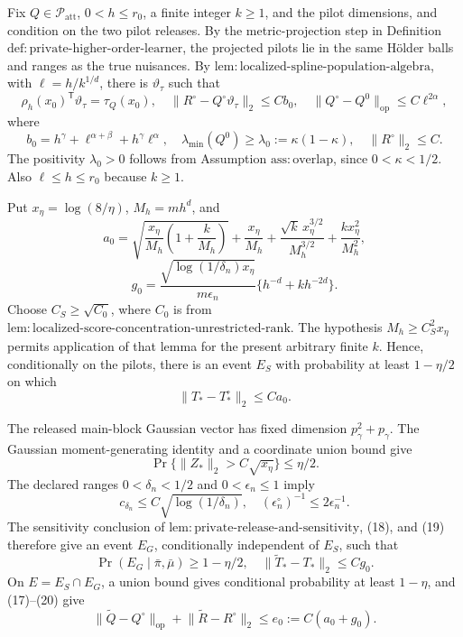 Fix \(Q\in\mathcal P_{\mathrm{att}}\), \(0<h\le r_0\), a finite integer \(k\ge1\), and the pilot dimensions, and condition on the two pilot releases.  By the metric-projection step in Definition \(\mathrm{def{:}private\text{-}higher\text{-}order\text{-}learner}\), the projected pilots lie in the same H\"older balls and ranges as the true nuisances.  By \(\mathrm{lem{:}localized\text{-}spline\text{-}population\text{-}algebra}\), with \(\ell=h/k^{1/d}\), there is \(\vartheta_\tau\) such that
\[
 \rho_h(x_0)^{\mathsf T}\vartheta_\tau=\tau_Q(x_0),\quad
 \lVert R^\circ-Q^\circ\vartheta_\tau\rVert_2\le Cb_0,
 \quad
 \lVert Q^\circ-Q^0\rVert_{\mathrm{op}}\le C\ell^{2\alpha}, \tag{14}
\]
where
\[
 b_0=h^\gamma+\ell^{\alpha+\beta}+h^\gamma\ell^\alpha,\quad
 \lambda_{\min}(Q^0)\ge\lambda_0:=\kappa(1-\kappa),\quad
 \lVert R^\circ\rVert_2\le C.                                \tag{15}
\]
The positivity \(\lambda_0>0\) follows from Assumption \(\mathrm{ass{:}overlap}\), since \(0<\kappa<1/2\).  Also \(\ell\le h\le r_0\) because \(k\ge1\).

Put \(x_\eta=\log(8/\eta)\), \(M_h=mh^d\), and
\[
 a_0=\sqrt{\frac{x_\eta}{M_h}\left(1+\frac{k}{M_h}\right)}
 +\frac{x_\eta}{M_h}
 +\frac{\sqrt{k}\,x_\eta^{3/2}}{M_h^{3/2}}
 +\frac{kx_\eta^2}{M_h^2},
\]
\[
 g_0=\frac{\sqrt{\log(1/\delta_n)x_\eta}}{m\epsilon_n}
       \{h^{-d}+kh^{-2d}\}.                                  \tag{16}
\]
Choose \(C_S\ge\sqrt{C_0}\), where \(C_0\) is from \(\mathrm{lem{:}localized\text{-}score\text{-}concentration\text{-}unrestricted\text{-}rank}\).  The hypothesis \(M_h\ge C_S^2x_\eta\) permits application of that lemma for the present arbitrary finite \(k\).  Hence, conditionally on the pilots, there is an event \(E_S\) with probability at least \(1-\eta/2\) on which
\[
 \lVert T_*-T_*^\circ\rVert_2\le Ca_0.                       \tag{17}
\]

The released main-block Gaussian vector has fixed dimension \(p_\gamma^2+p_\gamma\).  The Gaussian moment-generating identity and a coordinate union bound give
\[
 \Pr\{\lVert Z_*\rVert_2>C\sqrt{x_\eta}\}\le\eta/2.        \tag{18}
\]
The declared ranges \(0<\delta_n<1/2\) and \(0<\epsilon_n\le1\) imply
\[
 c_{\delta_n}\le C\sqrt{\log(1/\delta_n)},\quad
 (\epsilon_n^\circ)^{-1}\le2\epsilon_n^{-1}.                 \tag{19}
\]
The sensitivity conclusion of \(\mathrm{lem{:}private\text{-}release\text{-}and\text{-}sensitivity}\), (18), and (19) therefore give an event \(E_G\), conditionally independent of \(E_S\), such that
\[
 \Pr(E_G\mid\bar\pi,\bar\mu)\ge1-\eta/2,\quad
 \lVert\widetilde T_*-T_*\rVert_2\le Cg_0.                  \tag{20}
\]
On \(E=E_S\cap E_G\), a union bound gives conditional probability at least \(1-\eta\), and (17)--(20) give
\[
 \lVert\widetilde Q-Q^\circ\rVert_{\mathrm{op}}
 +\lVert\widetilde R-R^\circ\rVert_2\le e_0:=C(a_0+g_0).     \tag{21}
\]

